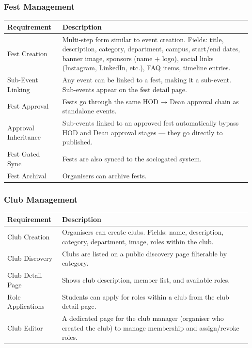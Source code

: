 \documentclass[12pt,a4paper]{article}
\begin{document}
\subsubsection{Fest Management}

\begin{tabularx}{\textwidth}{L{4cm} X}
\toprule
{}
\textbf{Requirement} & \textbf{Description} \\
\midrule
Fest Creation & Multi-step form similar to event creation. Fields: title, description, category, department, campus, start/end dates, banner image, sponsors (name + logo), social links (Instagram, LinkedIn, etc.), FAQ items, timeline entries. \\
Sub-Event Linking & Any event can be linked to a fest, making it a sub-event. Sub-events appear on the fest detail page. \\
Fest Approval & Fests go through the same HOD → Dean approval chain as standalone events. \\
Approval Inheritance & Sub-events linked to an approved fest automatically bypass HOD and Dean approval stages — they go directly to published. \\
Fest Gated Sync & Fests are also synced to the sociogated system. \\
Fest Archival & Organisers can archive fests. \\
\bottomrule
\end{tabularx}

\subsubsection{Club Management}

\begin{tabularx}{\textwidth}{L{4cm} X}
\toprule
{}
\textbf{Requirement} & \textbf{Description} \\
\midrule
Club Creation & Organisers can create clubs. Fields: name, description, category, department, image, roles within the club. \\
Club Discovery & Clubs are listed on a public discovery page filterable by category. \\
Club Detail Page & Shows club description, member list, and available roles. \\
Role Applications & Students can apply for roles within a club from the club detail page. \\
Club Editor & A dedicated page for the club manager (organiser who created the club) to manage membership and assign/revoke roles. \\
\bottomrule
\end{tabularx}
\end{document}
